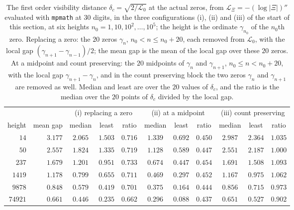 \begin{table}[htbp]
\centering\footnotesize
\setlength{\tabcolsep}{3pt}
\begin{tabular}{@{}rr ccc ccc ccc@{}}
\toprule
 & & \multicolumn{3}{c}{(i) replacing a zero} & \multicolumn{3}{c}{(ii) at a midpoint} & \multicolumn{3}{c}{(iii) count preserving}\\
\cmidrule(lr){3-5}\cmidrule(lr){6-8}\cmidrule(l){9-11}
height & mean gap & median & least & ratio & median & least & ratio & median & least & ratio\\
\midrule
$14$ & $3.177$ & $2.065$ & $1.503$ & $0.716$ & $1.339$ & $0.692$ & $0.450$ & $2.987$ & $2.364$ & $1.035$\\
$50$ & $2.557$ & $1.824$ & $1.335$ & $0.719$ & $1.128$ & $0.589$ & $0.447$ & $2.551$ & $2.187$ & $1.000$\\
$237$ & $1.679$ & $1.201$ & $0.951$ & $0.733$ & $0.674$ & $0.447$ & $0.454$ & $1.691$ & $1.508$ & $1.093$\\
$1419$ & $1.178$ & $0.799$ & $0.655$ & $0.711$ & $0.469$ & $0.297$ & $0.452$ & $1.167$ & $0.975$ & $1.062$\\
$9878$ & $0.848$ & $0.579$ & $0.419$ & $0.701$ & $0.375$ & $0.164$ & $0.444$ & $0.856$ & $0.715$ & $0.973$\\
$74921$ & $0.661$ & $0.446$ & $0.235$ & $0.662$ & $0.296$ & $0.088$ & $0.437$ & $0.651$ & $0.527$ & $0.902$\\
\bottomrule
\end{tabular}
\caption{The first order visibility distance $\delta_c=\sqrt{2/\mathcal L_0}$ at the actual zeros, from $\mathcal L_\Xi=-(\log|\Xi|)''$ evaluated with \texttt{mpmath} at $30$ digits, in the three configurations (i), (ii) and (iii) of the start of this section, at six heights $n_0=1,10,10^2,\dots,10^5$; the height is the ordinate $\gamma_{n_0}$ of the $n_0$th zero. Replacing a zero: the $20$ zeros $\gamma_n$, $n_0<n\le n_0+20$, each removed from $\mathcal L_0$, with the local gap $(\gamma_{n+1}-\gamma_{n-1})/2$; the mean gap is the mean of the local gap over these $20$ zeros. At a midpoint and count preserving: the $20$ midpoints of $\gamma_n$ and $\gamma_{n+1}$, $n_0\le n<n_0+20$, with the local gap $\gamma_{n+1}-\gamma_n$, and in the count preserving block the two zeros $\gamma_n$ and $\gamma_{n+1}$ are removed as well. Median and least are over the $20$ values of $\delta_c$, and the ratio is the median over the $20$ points of $\delta_c$ divided by the local gap.}
\label{tf:tab:deltac}
\end{table}

